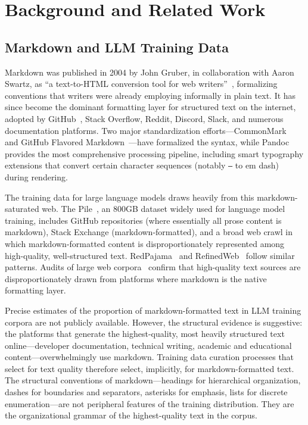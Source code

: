 \section{Background and Related Work}
\label{sec:background}

\subsection{Markdown and LLM Training Data}

Markdown was published in 2004 by John Gruber, in collaboration with Aaron Swartz, as ``a text-to-HTML conversion tool for web writers''~\cite{gruber2004markdown}, formalizing conventions that writers were already employing informally in plain text. It has since become the dominant formatting layer for structured text on the internet, adopted by GitHub~\cite{github2024octoverse}, Stack Overflow, Reddit, Discord, Slack, and numerous documentation platforms. Two major standardization efforts---CommonMark~\cite{commonmark2021} and GitHub Flavored Markdown~\cite{gfm2024}---have formalized the syntax, while Pandoc~\cite{pandoc2024} provides the most comprehensive processing pipeline, including smart typography extensions that convert certain character sequences (notably \texttt{---} to em dash) during rendering.

The training data for large language models draws heavily from this markdown-saturated web. The Pile~\cite{gao2020pile}, an 800GB dataset widely used for language model training, includes GitHub repositories (where essentially all prose content is markdown), Stack Exchange (markdown-formatted), and a broad web crawl in which markdown-formatted content is disproportionately represented among high-quality, well-structured text. RedPajama~\cite{together2023redpajama} and RefinedWeb~\cite{penedo2023refinedweb} follow similar patterns. Audits of large web corpora~\cite{dodge2021documenting, longpre2023pretrainers} confirm that high-quality text sources are disproportionately drawn from platforms where markdown is the native formatting layer.

Precise estimates of the proportion of markdown-formatted text in LLM training corpora are not publicly available. However, the structural evidence is suggestive: the platforms that generate the highest-quality, most heavily structured text online---developer documentation, technical writing, academic and educational content---overwhelmingly use markdown. Training data curation processes that select for text quality therefore select, implicitly, for markdown-formatted text. The structural conventions of markdown---headings for hierarchical organization, dashes for boundaries and separators, asterisks for emphasis, lists for discrete enumeration---are not peripheral features of the training distribution. They are the organizational grammar of the highest-quality text in the corpus.


